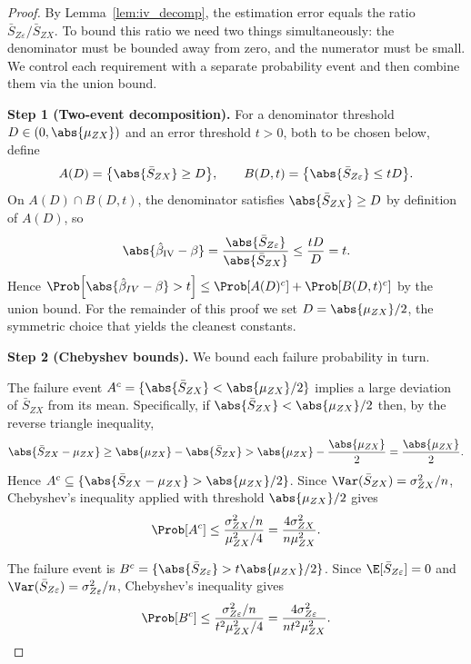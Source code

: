 \begin{proof}
    By Lemma~\ref{lem:iv_decomp}, the estimation error equals the ratio $\bar{S}_{Z\varepsilon}/\bar{S}_{ZX}$. To bound this ratio we need two things simultaneously: the denominator must be bounded away from zero, and the numerator must be small. We control each requirement with a separate probability event and then combine them via the union bound.

    \medskip\noindent\textbf{Step 1 (Two-event decomposition).}
    For a denominator threshold $D \in (0,\abs{\mu_{ZX}})$ and an error threshold $t > 0$, both to be chosen below, define
    \[
        A(D)   = \bigl\{\abs{\bar{S}_{ZX}} \geq D\bigr\},
        \qquad
        B(D,t) = \bigl\{\abs{\bar{S}_{Z\varepsilon}} \leq tD\bigr\}.
    \]
    On $A(D)\cap B(D,t)$, the denominator satisfies $\abs{\bar{S}_{ZX}}\geq D$ by definition of $A(D)$, so
    \[
        \abs{\hat{\beta}_{\mathrm{IV}} - \beta}= \frac{\abs{\bar{S}_{Z \varepsilon}}}{\abs{\bar{S}_{ZX}}} \leq \frac{tD}{D} = t.
    \]
    Hence $\Prob\!\left[\abs{\hat\beta_{IV}-\beta}>t\right] \leq \Prob[A(D)^c] + \Prob[B(D,t)^c]$ by the union bound. For the remainder of this proof we set $D = \abs{\mu_{ZX}}/2$, the symmetric choice that yields the cleanest constants.

    \medskip\noindent\textbf{Step 2 (Chebyshev bounds).}
    We bound each failure probability in turn.

    The failure event $A^c = \{\abs{\bar{S}_{ZX}} < \abs{\mu_{ZX}}/2\}$ implies a large deviation of $\bar{S}_{ZX}$ from its mean. Specifically, if $\abs{\bar{S}_{ZX}} < \abs{\mu_{ZX}}/2$ then, by the reverse triangle inequality,
    \[
        \abs{\bar{S}_{ZX} - \mu_{ZX}} \geq \abs{\mu_{ZX}} - \abs{\bar{S}_{ZX}} > \abs{\mu_{ZX}} - \frac{\abs{\mu_{ZX}}}{2} = \frac{\abs{\mu_{ZX}}}{2}.
    \]
    Hence $A^c \subseteq \{\abs{\bar{S}_{ZX}-\mu_{ZX}} > \abs{\mu_{ZX}}/2\}$. Since $\Var(\bar{S}_{ZX}) = \sigma_{ZX}^2/n$, Chebyshev's inequality applied with threshold $\abs{\mu_{ZX}}/2$ gives
    \[
        \Prob[A^c] \leq \frac{\sigma_{ZX}^2/n}{\mu_{ZX}^2/4} = \frac{4\sigma_{ZX}^2}{n\mu_{ZX}^2}.
    \]

    The failure event is $B^c = \{\abs{\bar{S}_{Z\varepsilon}} > t\abs{\mu_{ZX}}/2\}$. Since $\E[\bar{S}_{Z\varepsilon}] = 0$ and $\Var(\bar{S}_{Z\varepsilon}) = \sigma_{Z\varepsilon}^2/n$, Chebyshev's inequality gives
    \[
        \Prob[B^c] \leq \frac{\sigma_{Z\varepsilon}^2/n}{t^2\mu_{ZX}^2/4} = \frac{4\sigma_{Z\varepsilon}^2}{nt^2\mu_{ZX}^2}.
    \]


\end{proof}
